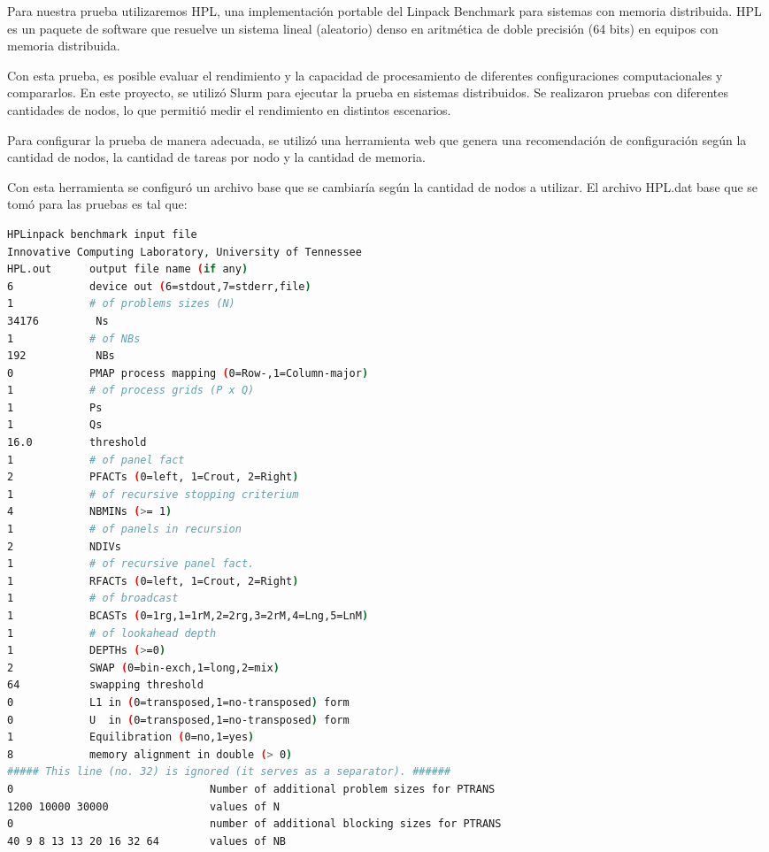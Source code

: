 \begin{spacing}{1.5}
  Para nuestra prueba utilizaremos HPL, una implementación portable del Linpack Benchmark para sistemas con memoria distribuida. HPL es un paquete de software que resuelve un sistema lineal (aleatorio) denso en aritmética de doble precisión (64 bits) en equipos con memoria distribuida.\cite{hpl-linpack}

  Con esta prueba, es posible evaluar el rendimiento y la capacidad de procesamiento de diferentes configuraciones computacionales y compararlos. En este proyecto, se utilizó Slurm para ejecutar la prueba en sistemas distribuidos. Se realizaron pruebas con diferentes cantidades de nodos, lo que permitió medir el rendimiento en distintos escenarios.

  Para configurar la prueba de manera adecuada, se utilizó una herramienta web que genera una recomendación de configuración según la cantidad de nodos, la cantidad de tareas por nodo y la cantidad de memoria.\cite{tune-hpl-dat-file}

  Con esta herramienta se configuró un archivo base que se cambiaría según la cantidad de nodos a utilizar. El archivo HPL.dat base que se tomó para las pruebas es tal que:

  \begin{lstlisting}[language=bash]
      HPLinpack benchmark input file
Innovative Computing Laboratory, University of Tennessee
HPL.out      output file name (if any)
6            device out (6=stdout,7=stderr,file)
1            # of problems sizes (N)
34176         Ns
1            # of NBs
192           NBs
0            PMAP process mapping (0=Row-,1=Column-major)
1            # of process grids (P x Q)
1            Ps
1            Qs
16.0         threshold
1            # of panel fact
2            PFACTs (0=left, 1=Crout, 2=Right)
1            # of recursive stopping criterium
4            NBMINs (>= 1)
1            # of panels in recursion
2            NDIVs
1            # of recursive panel fact.
1            RFACTs (0=left, 1=Crout, 2=Right)
1            # of broadcast
1            BCASTs (0=1rg,1=1rM,2=2rg,3=2rM,4=Lng,5=LnM)
1            # of lookahead depth
1            DEPTHs (>=0)
2            SWAP (0=bin-exch,1=long,2=mix)
64           swapping threshold
0            L1 in (0=transposed,1=no-transposed) form
0            U  in (0=transposed,1=no-transposed) form
1            Equilibration (0=no,1=yes)
8            memory alignment in double (> 0)
##### This line (no. 32) is ignored (it serves as a separator). ######
0                               Number of additional problem sizes for PTRANS
1200 10000 30000                values of N
0                               number of additional blocking sizes for PTRANS
40 9 8 13 13 20 16 32 64        values of NB


\end{lstlisting}
\end{spacing}

